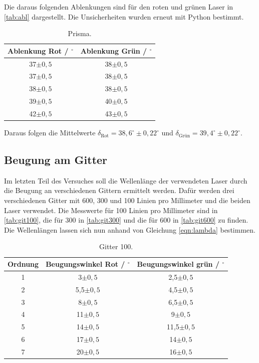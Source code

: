 \noindent
Die daraus folgenden Ablenkungen sind für den roten und grünen Laser in \autoref{tab:abl} dargestellt. Die Unsicherheiten wurden erneut mit Python bestimmt.

\begin{table}[H]
  \centering
  \caption{Prisma.}
  \label{tab:abl}
  \begin{tabular}{c c }
    \toprule
    Ablenkung Rot / $^{\circ}$ & Ablenkung Grün / $^{\circ}$\\
    \midrule
    37$\pm 0,5$ & 38$\pm 0,5$\\
    37$\pm 0,5$ & 38$\pm 0,5$\\
    38$\pm 0,5$ & 38$\pm 0,5$\\
    39$\pm 0,5$ & 40$\pm 0,5$\\
    42$\pm 0,5$ & 43$\pm 0,5$\\
    \bottomrule
  \end{tabular}
\end{table}

\noindent
Daraus folgen die Mittelwerte $\delta_\text{Rot} = 38,6^{\circ} \pm 0,22^{\circ}$ und $\delta_\text{Grün} = 39,4^{\circ} \pm 0,22^{\circ}$.

\subsection{Beugung am Gitter}

Im letzten Teil des Versuches soll die Wellenlänge der verwendeten Laser durch die Beugung an verschiedenen Gittern ermittelt werden. Dafür werden drei verschiedenen
Gitter mit 600, 300 und 100 Linien pro Millimeter und die beiden Laser verwendet. Die Messwerte für 100 Linien pro Millimeter sind in \autoref{tab:git100}, die
für 300 in \autoref{tab:git300} und die für 600 in \autoref{tab:git600} zu finden.
\newline
Die Wellenlängen lassen sich nun anhand von Gleichung \eqref{eqn:lambda} bestimmen.

\begin{table}[H]
  \centering
  \caption{Gitter 100.}
  \label{tab:git100}
  \begin{tabular}{c c c}
    \toprule
    Ordnung & Beugungswinkel Rot / $^{\circ}$ & Beugungswinkel grün / $^{\circ}$\\
    \midrule
    1 & 3$\pm 0,5$ & 2,5$\pm 0,5$\\
    2 & 5,5$\pm 0,5$ & 4,5$\pm 0,5$\\
    3 & 8$\pm 0,5$ & 6,5$\pm 0,5$\\
    4 & 11$\pm 0,5$ & 9$\pm 0,5$\\
    5 & 14$\pm 0,5$ & 11,5$\pm 0,5$\\
    6 & 17$\pm 0,5$ & 14$\pm 0,5$\\
    7 & 20$\pm 0,5$ & 16$\pm 0,5$\\
    \bottomrule
  \end{tabular}
\end{table}

